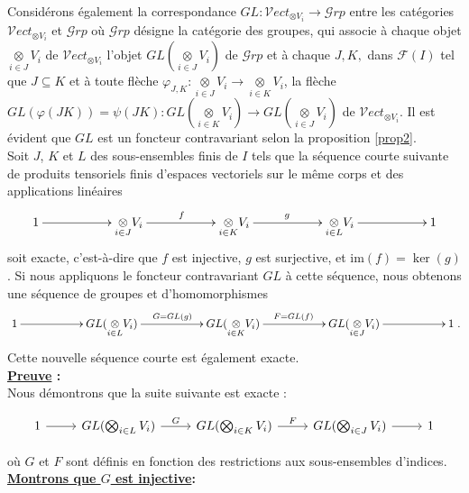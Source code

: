 \documentclass[a4paper, 14pt]{report}
\begin{document}
\begin{onehalfspace}
{			Considérons également la correspondance $GL: \mathcal{V}ect_{\otimes V_i}\rightarrow \mathcal{G}rp$ entre les catégories $\mathcal{V}ect_{\otimes V_i}$ et $\mathcal{G}rp$ où $\mathcal{G}rp$ désigne la catégorie des groupes, qui associe à chaque objet $\underset{i\in J}\otimes V_i$ de $\mathcal{V}ect_{\otimes V_i}$ l'objet $GL(\underset{i\in J}\otimes V_i)$ de $\mathcal{G}rp$ et à chaque $J, K,$ dans $\mathcal{F}(I)$ tel que $J\subseteq K$ et à toute flèche $\varphi_{J,K}: \underset{i\in J}\otimes V_i\rightarrow \underset{i\in K}\otimes V_i$, la flèche $GL(\varphi(JK))= \psi(JK): GL(\underset{i\in K}\otimes V_i)\rightarrow GL(\underset{i\in J}\otimes V_i)$ de $\mathcal{V}ect_{\otimes V_i}$. Il est évident que $GL$ est un foncteur contravariant selon la proposition \ref{prop2}.\\Soit $J$, $K$ et $L$ des sous-ensembles finis de $I$ tels que la séquence courte suivante de produits tensoriels finis d'espaces vectoriels sur le même corps et des applications linéaires 
			$$\xymatrix{1\ar@{->}[rr]&&\underset{i\in J}\otimes V_i\ar@{->}[rr]^{f}&&\underset{i\in K}\otimes V_i\ar@{->}[rr]^{g}&&\underset{i\in L}\otimes V_i\ar@{->}[rr] &&1}$$
			soit exacte, c'est-à-dire que $f$ est injective, $g$ est surjective, et $\text{im}(f) = \ker(g)$. Si nous appliquons le foncteur contravariant $GL$ à cette séquence, nous obtenons une séquence de groupes et d'homomorphismes 
			$$\xymatrix{1\ar@{->}[rr]&&GL(\underset{i\in L}\otimes V_i)\ar@{->}[rr]^{G=GL(g)}&&GL(\underset{i\in K}\otimes V_i)\ar@{->}[rr]^{F=GL(f)}&&GL(\underset{i\in J}\otimes V_i)\ar@{->}[rr] &&1}.$$
			Cette nouvelle séquence courte est également exacte. \\ 
			
			\textbf{\underline{Preuve} :}\\
			
			Nous démontrons que la suite suivante est exacte :
			
			\[
			\begin{tikzcd}
				1 \arrow[r] & GL(\bigotimes_{i\in L} V_i) \arrow[r, "G"] & GL(\bigotimes_{i\in K} V_i) \arrow[r, "F"] & GL(\bigotimes_{i\in J} V_i) \arrow[r] & 1
			\end{tikzcd}
			\]
			
			où $G$ et $F$ sont définis en fonction des restrictions aux sous-ensembles d'indices.\\
			
			\textbf{\underline{Montrons que \(G\) est injective}:}\\
			
}
\end{onehalfspace}
\end{document}

